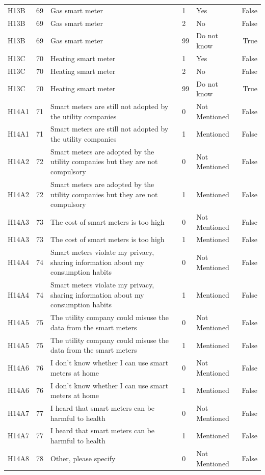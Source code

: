 \begin{tabular}{lrlllr}
H13B & 69 & Gas smart meter & 1 & Yes & False \\
H13B & 69 & Gas smart meter & 2 & No & False \\
H13B & 69 & Gas smart meter & 99 & Do not know & True \\
H13C & 70 & Heating smart meter & 1 & Yes & False \\
H13C & 70 & Heating smart meter & 2 & No & False \\
H13C & 70 & Heating smart meter & 99 & Do not know & True \\
H14A1 & 71 & Smart meters are still not adopted by the utility companies & 0 & Not Mentioned & False \\
H14A1 & 71 & Smart meters are still not adopted by the utility companies & 1 & Mentioned & False \\
H14A2 & 72 & Smart meters are adopted by the utility companies but they are not compulsory & 0 & Not Mentioned & False \\
H14A2 & 72 & Smart meters are adopted by the utility companies but they are not compulsory & 1 & Mentioned & False \\
H14A3 & 73 & The cost of smart meters is too high & 0 & Not Mentioned & False \\
H14A3 & 73 & The cost of smart meters is too high & 1 & Mentioned & False \\
H14A4 & 74 & Smart meters violate my privacy, sharing information about my consumption habits & 0 & Not Mentioned & False \\
H14A4 & 74 & Smart meters violate my privacy, sharing information about my consumption habits & 1 & Mentioned & False \\
H14A5 & 75 & The utility company could misuse the data from the smart meters & 0 & Not Mentioned & False \\
H14A5 & 75 & The utility company could misuse the data from the smart meters & 1 & Mentioned & False \\
H14A6 & 76 & I don’t know whether I can use smart meters at home & 0 & Not Mentioned & False \\
H14A6 & 76 & I don’t know whether I can use smart meters at home & 1 & Mentioned & False \\
H14A7 & 77 & I heard that smart meters can be harmful to health & 0 & Not Mentioned & False \\
H14A7 & 77 & I heard that smart meters can be harmful to health & 1 & Mentioned & False \\
H14A8 & 78 & Other, please specify & 0 & Not Mentioned & False \\

\end{tabular}
